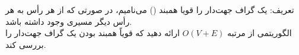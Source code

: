 تعریف: یک گراف جهت‌دار را قویا همبند () می‌نامیم، در صورتی که از هر رأس به هر رأس دیگر مسیری وجود داشته باشد.
\\
الگوریتمی از مرتبه $O(V+E)$ ارائه دهید که قویاً همبند بودن یک گراف جهت‌دار را بررسی کند.
